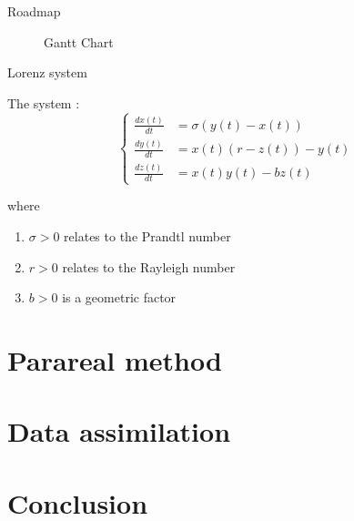 \documentclass[10pt,xcolor={table,dvipsnames},t]{beamer}
\begin{document}
	\begin{frame}{Roadmap}
	   	\begin{figure}
	   	  \centering
        	\caption{Gantt Chart}
		\end{figure}
		
	\end{frame}
	
	
	\begin{frame}{Lorenz system}
		
		The system :
		$$\left\{\begin{aligned} 
			\frac{d x(t)}{d t} &=\sigma(y(t)-x(t))\\
			\frac{d y(t)}{d t}&=x(t)(r-z(t))-y(t) \\
			\frac{d z(t)}{d t}&=x(t)y(t)-bz(t)
		\end{aligned}\right.$$
	
		where
		
		\begin{enumerate}[\textbullet]
			\item $\sigma > 0$  relates to the Prandtl number
			\item $r > 0$  relates to the Rayleigh number
			\item $b > 0$ is a geometric factor
		\end{enumerate}
		
	\end{frame}

	\section{Parareal method}

	
	
	\section{Data assimilation}
	
	
	
	\section{Conclusion}
	
\end{document}
